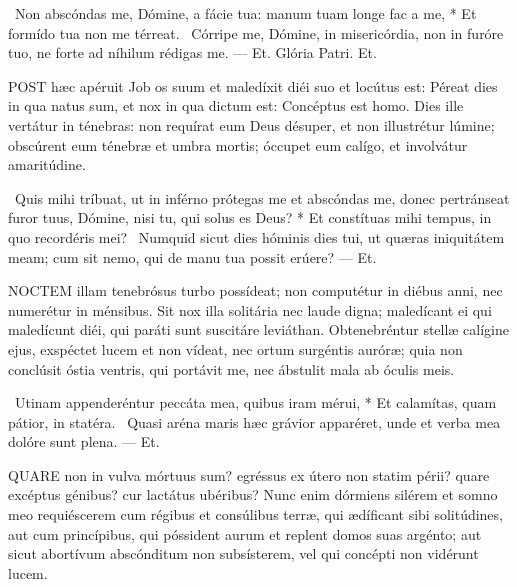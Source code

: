 \R\ Non abscóndas me, Dómine, a fácie tua: manum tuam longe fac a me, * Et formído tua non me térreat. \V\ Córripe me, Dómine, in misericórdia, non in furóre tuo, ne forte ad níhilum rédigas me. — Et. Glória Patri. Et.




\lettrine[lines=2]{P}{OST} hæc apéruit Job os suum et maledíxit diéi suo et locútus est: Péreat dies in qua natus sum, et nox in qua dictum est: Concéptus est homo. Dies ille vertátur in ténebras: non requírat eum Deus désuper, et non illustrétur lúmine; obscúrent eum ténebræ et umbra mortis; óccupet eum calígo, et involvátur amaritúdine.

\R\ Quis mihi tríbuat, ut in inférno prótegas me et abscóndas me, donec pertránseat furor tuus, Dómine, nisi tu, qui solus es Deus? * Et constítuas mihi tempus, in quo recordéris mei? \V\ Numquid sicut dies hóminis dies tui, ut quæras iniquitátem meam; cum sit nemo, qui de manu tua possit erúere? — Et.


\lettrine[lines=2]{N}{OCTEM} illam tenebrósus turbo possídeat; non computétur in diébus anni, nec numerétur in ménsibus. Sit nox illa solitária nec laude digna; maledícant ei qui maledícunt diéi, qui paráti sunt suscitáre leviáthan. Obtenebréntur stellæ calígine ejus, exspéctet lucem et non vídeat, nec ortum surgéntis auróræ; quia non conclúsit óstia ventris, qui portávit me, nec ábstulit mala ab óculis meis.

\R\ Utinam appenderéntur peccáta mea, quibus iram mérui, * Et calamítas, quam pátior, in statéra. \V\ Quasi aréna maris hæc grávior apparéret, unde et verba mea dolóre sunt plena. — Et.



\lettrine[lines=2]{Q}{UARE} non in vulva mórtuus sum? egréssus ex útero non statim périi? quare excéptus génibus? cur lactátus ubéribus? Nunc enim dórmiens silérem et somno meo requiéscerem cum régibus et consúlibus terræ, qui ædíficant sibi solitúdines, aut cum princípibus, qui póssident aurum et replent domos suas argénto; aut sicut abortívum abscónditum non subsísterem, vel qui concépti non vidérunt lucem.

